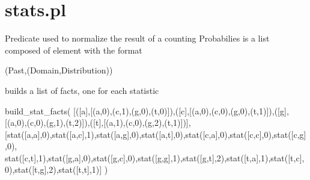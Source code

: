 


\section{stats.pl}

\label{sec:stats}

\begin{description}
Predicate used to normalize the result of a counting
Probabilies is a list composed of element with the format

\begin{code}
(Past,(Domain,Distribution))
\end{code}

builds a list of facts, one for each statistic

\begin{code}
build_stat_facts(
      [([a],[(a,0),(c,1),(g,0),(t,0)]),([c],[(a,0),(c,0),(g,0),(t,1)]),([g],[(a,0),(c,0),(g,1),(t,2)]),([t],[(a,1),(c,0),(g,2),(t,1)])],
      [stat([a,a],0),stat([a,c],1),stat([a,g],0),stat([a,t],0),stat([c,a],0),stat([c,c],0),stat([c,g],0),
       stat([c,t],1),stat([g,a],0),stat([g,c],0),stat([g,g],1),stat([g,t],2),stat([t,a],1),stat([t,c],0),stat([t,g],2),stat([t,t],1)]
      )
\end{code}

\end{description}

